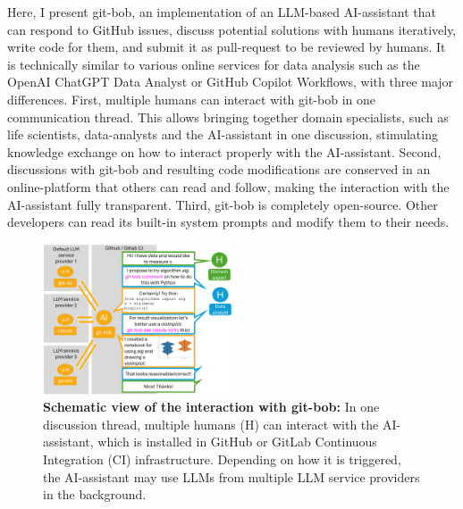 \documentclass[sn-mathphys-num]{sn-jnl}%
\theoremstyle{thmstyleone}%
\theoremstyle{thmstyletwo}%
\theoremstyle{thmstylethree}%
\begin{document}
Here, I present git-bob, an implementation of an LLM-based AI-assistant that can respond to GitHub issues, discuss potential solutions with humans iteratively, write code for them, and submit it as pull-request to be reviewed by humans. It is technically similar to various online services for data analysis such as the OpenAI ChatGPT Data Analyst or GitHub Copilot Workflows, with three major differences. First, multiple humans can interact with git-bob in one communication thread. This allows bringing together domain specialists, such as life scientists, data-analysts and the AI-assistant in one discussion, stimulating knowledge exchange on how to interact properly with the AI-assistant. Second, discussions with git-bob and resulting code modifications are conserved in an online-platform that others can read and follow, making the interaction with the AI-assistant fully transparent. Third, git-bob is completely open-source. Other developers can read its built-in system prompts and modify them to their needs.


\begin{figure}[h]
\centering
\includegraphics[width=0.5\textwidth]{example_interaction.png}
\caption{\textbf{Schematic view of the interaction with git-bob:} In one discussion thread, multiple humans (H) can interact with the AI-assistant, which is installed in GitHub or GitLab Continuous Integration (CI) infrastructure. Depending on how it is triggered, the AI-assistant may use LLMs from multiple LLM service providers in the background.
\newline
\newline
}
\label{fig:example_interaction}
\end{figure}
\end{document}
